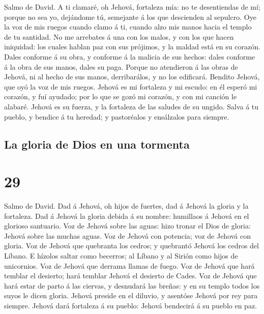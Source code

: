  Salmo de David. A ti clamaré, oh Jehová, fortaleza mía:
no te desentiendas de mí; porque no sea yo, dejándome tú, semejante á
los que descienden al sepulcro.  Oye la voz de mis ruegos
cuando clamo á ti, cuando alzo mis manos hacia el templo de tu santidad.
 No me arrebates á una con los malos, y con los que hacen
iniquidad: los cuales hablan paz con sus prójimos, y la maldad está en
su corazón.  Dales conforme á su obra, y conforme á la
malicia de sus hechos: dales conforme á la obra de sus manos, dales su
paga.  Porque no atendieron á las obras de Jehová, ni al
hecho de sus manos, derribarálos, y no los edificará. 
Bendito Jehová, que oyó la voz de mis ruegos.  Jehová es
mi fortaleza y mi escudo: en él esperó mi corazón, y fuí ayudado; por lo
que se gozó mi corazón, y con mi canción le alabaré. 
Jehová es su fuerza, y la fortaleza de las saludes de su ungido.
 Salva á tu pueblo, y bendice á tu heredad; y pastoréalos
y ensálzalos para siempre.

\hypertarget{la-gloria-de-dios-en-una-tormenta}{%
\subsection{La gloria de Dios en una
tormenta}\label{la-gloria-de-dios-en-una-tormenta}}

\hypertarget{section-28}{%
\section{29}\label{section-28}}

 Salmo de David. Dad á Jehová, oh hijos de fuertes, dad á
Jehová la gloria y la fortaleza.  Dad á Jehová la gloria
debida á su nombre: humillaos á Jehová en el glorioso santuario.
 Voz de Jehová sobre las aguas: hizo tronar el Dios de
gloria: Jehová sobre las muchas aguas.  Voz de Jehová con
potencia; voz de Jehová con gloria.  Voz de Jehová que
quebranta los cedros; y quebrantó Jehová los cedros del Líbano.
 E hízolos saltar como becerros; al Líbano y al Sirión
como hijos de unicornios.  Voz de Jehová que derrama
llamas de fuego.  Voz de Jehová que hará temblar el
desierto; hará temblar Jehová el desierto de Cades.  Voz
de Jehová que hará estar de parto á las ciervas, y desnudará las breñas:
y en su templo todos los suyos le dicen gloria.  Jehová
preside en el diluvio, y asentóse Jehová por rey para siempre.
 Jehová dará fortaleza á su pueblo: Jehová bendecirá á su
pueblo en paz.

